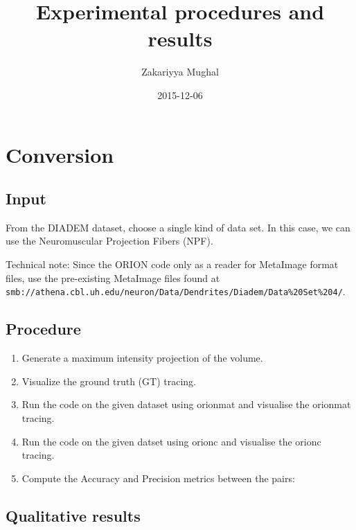 \documentclass[12pt]{article}
\title{Experimental procedures and results}
\author{Zakariyya Mughal}
\date{2015-12-06}
\begin{document}
\singlespacing

\maketitle
\tableofcontents

\section{Conversion}

\subsection{Input}

From the DIADEM dataset, choose a single kind of data set. In this case, we can
use the Neuromuscular Projection Fibers (NPF).

Technical note: Since the ORION code only as a reader for MetaImage format
files, use the pre-existing MetaImage files found at
\nolinkurl{smb://athena.cbl.uh.edu/neuron/Data/Dendrites/Diadem/Data\%20Set\%204/}.

\subsection{Procedure}

\begin{enumerate}
	\item Generate a maximum intensity projection of the
		volume.
	\item Visualize the ground truth (GT) tracing.
	\item Run the code on the given dataset using
		\gls{orionmat}
		and visualise the \gls{orionmat} tracing.
	\item Run the code on the given datset using
		\gls{orionc}
		and visualise the \gls{orionc} tracing.
	\item Compute the Accuracy and Precision metrics between the pairs:
\end{enumerate}

\subsection{Qualitative results}
\end{document}
